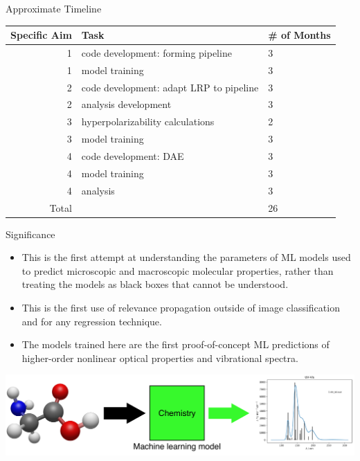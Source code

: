 \documentclass[compress]{beamer}
\begin{document}
\begin{frame}{Approximate Timeline}
\begin{table}[]
\centering
\begin{tabular}{@{}rp{}l@{}}
\toprule
Specific Aim & Task                                    & \# of Months \\ \midrule
1            & code development: forming pipeline      & 3            \\
1            & model training                          & 3            \\
2            & code development: adapt LRP to pipeline & 3            \\
2            & analysis development                    & 3            \\
3            & hyperpolarizability calculations        & 2            \\
3            & model training                          & 3            \\
4            & code development: DAE                   & 3            \\
4            & model training                          & 3            \\
4            & analysis                                & 3            \\ \midrule
Total        &                                         & 26           \\ \bottomrule
\end{tabular}
\end{table}\end{frame}

\begin{frame}{Significance}
  \begin{itemize}
  \item This is the first attempt at understanding the parameters of ML models used to predict microscopic and macroscopic molecular properties, rather than treating the models as black boxes that cannot be understood.
  \item This is the first use of relevance propagation outside of image classification and for any regression technique.
  \item The models trained here are the first proof-of-concept ML predictions of higher-order nonlinear optical properties and vibrational spectra.
  \end{itemize}
  \begin{center}
    \includegraphics[width=1.00\textwidth]{./figures/learning_chemistry.pdf}
  \end{center}
\end{frame}
\end{document}
